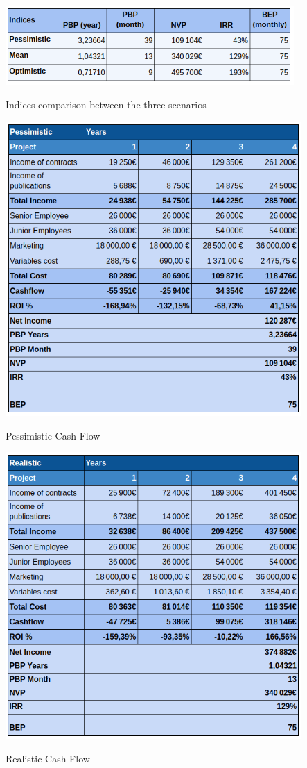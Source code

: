 \begin{table}[H]
	\centering
	\includegraphics[width=11cm]{indices.png}
	\caption{Indices comparison between the three scenarios}
	\label{tab:indicies}
\end{table}
\begin{table}[H]
	\centering
	\includegraphics[width=11.3cm]{pessimistic.png}
	\caption{Pessimistic Cash Flow}
	\label{tab:pessimistic}
\end{table}
\begin{table}[H]
	\centering
	\includegraphics[width=11.3cm]{realistic.png}
	\caption{Realistic Cash Flow}
	\label{tab:realistic}
\end{table}

